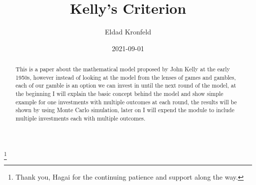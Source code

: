 \documentclass{article}
\title{Kelly's Criterion}
\date{2021-09-01}
\author{Eldad Kronfeld}
\begin{document}
	\maketitle
	\thanks{Thank you, Hagai for the continuing patience and support along the way.}
	\begin{abstract}
		This is a paper about the mathematical model proposed by John Kelly at the early 1950s, 
		however instead of looking at the model from the lenses of games and gambles, each of our gamble is an option we can invest in until the next round of the model, at the beginning I will explain the basic concept behind the model and show simple example for one investments with multiple outcomes at each round, the results will be shown by using Monte Carlo simulation, later on I will expend the module to include multiple investments each with multiple outcomes.
	\end{abstract}
	\tableofcontents
	\newpage
	
\end{document}
